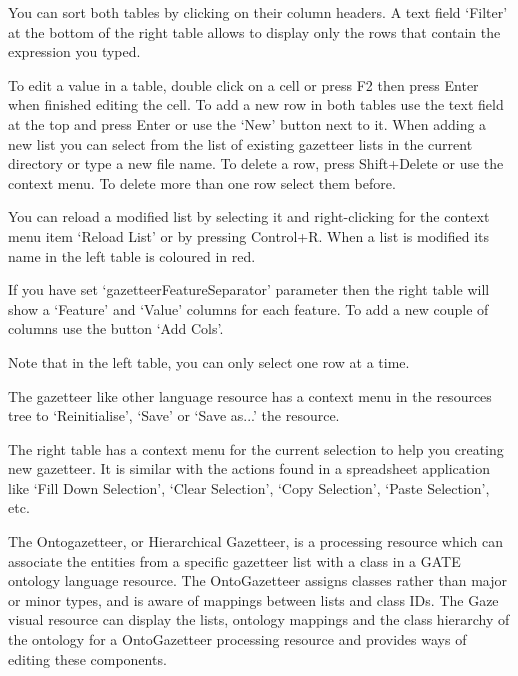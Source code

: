 You can sort both tables by clicking on their column headers. A text field
`Filter' at the bottom of the right table allows to display only the rows
that contain the expression you typed.

To edit a value in a table, double click on a cell or press F2 then press
Enter when finished editing the cell. To add a new row in both tables use
the text field at the top and press Enter or use the `New' button next to
it. When adding a new list you can select from the list of existing
gazetteer lists in the current directory or type a new file name. To delete
a row, press Shift+Delete or use the context menu. To delete more than one
row select them before.

You can reload a modified list by selecting it and right-clicking for the
context menu item `Reload List' or by pressing Control+R. When a list is
modified its name in the left table is coloured in red.

If you have set `gazetteerFeatureSeparator' parameter then the right table
will show a `Feature' and `Value' columns for each feature. To add a new
couple of columns use the button `Add Cols'.

Note that in the left table, you can only select one row at a time.

The gazetteer like other language resource has a context menu in the
resources tree to `Reinitialise', `Save' or `Save as...' the resource.

The right table has a context menu for the current selection to help you
creating new gazetteer. It is similar with the actions found in a
spreadsheet application like `Fill Down Selection', `Clear Selection', `Copy
Selection', `Paste Selection', etc.


The Ontogazetteer, or Hierarchical Gazetteer, is a processing resource which
can associate the entities from a specific gazetteer list with a class
in a GATE ontology language resource.  
The OntoGazetteer assigns classes rather than major or
minor types, and is aware of mappings between lists and class
IDs. The Gaze visual resource can display the lists, ontology mappings and 
the class hierarchy of the ontology for a OntoGazetteer processing resource 
and provides ways of editing these components.


